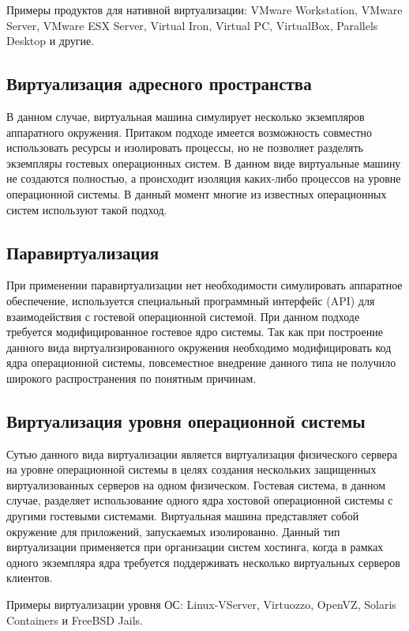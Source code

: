 Примеры продуктов для нативной виртуализации: VMware Workstation, VMware Server, VMware ESX Server, Virtual Iron, Virtual PC, VirtualBox, Parallels Desktop и другие.

\subsection{Виртуализация адресного пространства}\label{sec:virt_space_emu}
В данном случае, виртуальная машина симулирует несколько экземпляров аппаратного окружения. Притаком подходе имеется возможность совместно использовать ресурсы и изолировать процессы, но не позволяет разделять экземпляры гостевых операционных систем. В данном виде виртуальные машину не создаются полностью, а происходит изоляция каких-либо процессов на уровне операционной системы. В данный момент многие из известных операционных систем используют такой подход.

\subsection{Паравиртуализация}\label{sec:paravirt}
При применении паравиртуализации нет необходимости симулировать аппаратное обеспечение, используется специальный программный интерфейс (API) для взаимодействия с гостевой операционной системой. При данном подходе требуется модифицированное гостевое ядро системы. Так как при построение данного вида виртуализированного окружения необходимо модифицировать код ядра операционной системы, повсеместное внедрение данного типа не получило широкого распространения по понятным причинам.

\subsection{Виртуализация уровня операционной системы}\label{sec:os_level_virt}
Сутью данного вида виртуализации является виртуализация физического сервера на уровне операционной системы в целях создания нескольких защищенных виртуализованных серверов на одном физическом. Гостевая система, в данном случае, разделяет использование одного ядра хостовой операционной системы с другими гостевыми системами. Виртуальная машина представляет собой окружение для приложений, запускаемых изолированно. Данный тип виртуализации применяется при организации систем хостинга, когда в рамках одного экземпляра ядра требуется поддерживать несколько виртуальных серверов клиентов.

Примеры виртуализации уровня ОС: Linux-VServer, Virtuozzo, OpenVZ, Solaris Containers и FreeBSD Jails.

